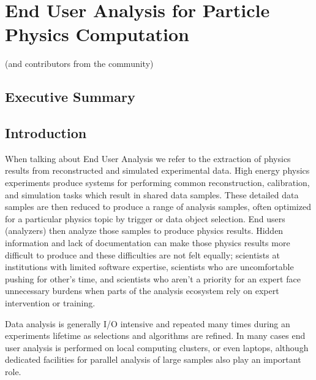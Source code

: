 
\setcounter{chapter}{4} 


\chapter{End User Analysis for Particle Physics Computation}

   {(and contributors from the community)}

\section{Executive Summary}

\section{Introduction}
When talking about End User Analysis we refer to the extraction of physics results from reconstructed and simulated experimental data. High energy physics experiments produce systems for performing common reconstruction, calibration, and simulation tasks which result in shared data samples. These detailed data samples are then reduced to produce a range of analysis samples, often optimized for a particular physics topic by trigger or data object selection. End users (analyzers) then analyze those samples to produce physics results.  Hidden information and lack of documentation can make those physics results more difficult to produce and these difficulties are not felt equally; scientists at institutions with limited software expertise, scientists who are uncomfortable pushing for other's time, and scientists who aren't a priority for an expert face unnecessary burdens when parts of the analysis ecosystem rely on expert intervention or training. 

Data analysis is generally I/O intensive and repeated many times during an experiments lifetime as selections and algorithms are refined. In many cases end user analysis is performed on local computing clusters, or even laptops, although dedicated facilities for parallel analysis of large samples also play an important role.

